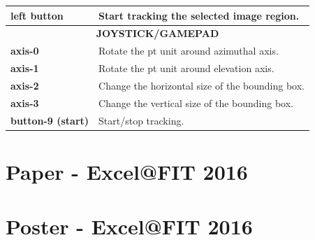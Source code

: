 \begin{table}[htbp]
\begin{tabularx}{1.0\textwidth}{lX}
		\midrule
		\multicolumn{1}{l}{\textbf{left button}} & \multicolumn{1}{l}{Start tracking the selected image region.} \\
		\toprule
		\multicolumn{2}{c}{\textbf{JOYSTICK/GAMEPAD}} \\
		\midrule
		\multicolumn{1}{l}{\textbf{axis-0}} & \multicolumn{1}{l}{Rotate the \gls{pt} unit around azimuthal axis.} \\
		\multicolumn{1}{l}{\textbf{axis-1}} & \multicolumn{1}{l}{Rotate the \gls{pt} unit around elevation axis.} \\
		\multicolumn{1}{l}{\textbf{axis-2}} & \multicolumn{1}{l}{Change the horizontal size of the bounding box.} \\
		\multicolumn{1}{l}{\textbf{axis-3}} & \multicolumn{1}{l}{Change the vertical size of the bounding box.} \\
		\multicolumn{1}{l}{\textbf{button-9 (start)}} & \multicolumn{1}{l}{Start/stop tracking.} \\
		\bottomrule
	\end{tabularx}
	\label{tab:ols_controls}
\end{table}

\chapter{Paper - Excel@FIT 2016}



\chapter{Poster - Excel@FIT 2016}

